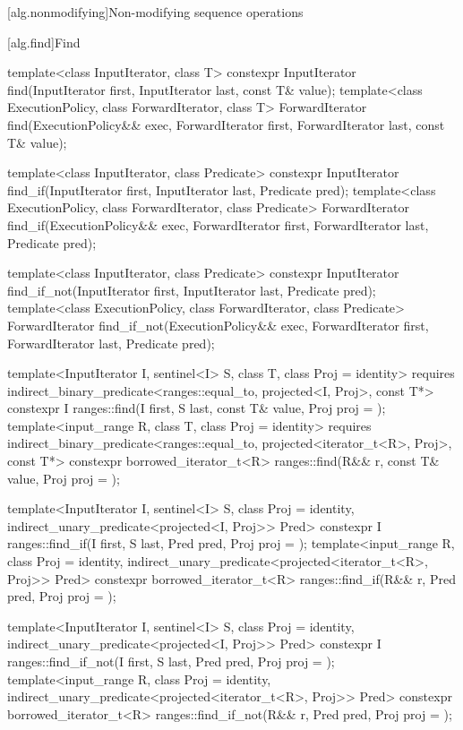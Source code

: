 [alg.nonmodifying]{Non-modifying sequence operations}

\setcounter{subsection}{4}
[alg.find]{Find}

%
%
%
\begin{itemdecl}
template<class InputIterator, class T>
  constexpr InputIterator find(InputIterator first, InputIterator last,
                               const T& value);
template<class ExecutionPolicy, class ForwardIterator, class T>
  ForwardIterator find(ExecutionPolicy&& exec, ForwardIterator first, ForwardIterator last,
                       const T& value);

template<class InputIterator, class Predicate>
  constexpr InputIterator find_if(InputIterator first, InputIterator last,
                                  Predicate pred);
template<class ExecutionPolicy, class ForwardIterator, class Predicate>
  ForwardIterator find_if(ExecutionPolicy&& exec, ForwardIterator first, ForwardIterator last,
                          Predicate pred);

template<class InputIterator, class Predicate>
  constexpr InputIterator find_if_not(InputIterator first, InputIterator last,
                                      Predicate pred);
template<class ExecutionPolicy, class ForwardIterator, class Predicate>
  ForwardIterator find_if_not(ExecutionPolicy&& exec,
                              ForwardIterator first, ForwardIterator last,
                              Predicate pred);

template<InputIterator I, sentinel<I> S, class T, class Proj = identity>
 requires indirect_binary_predicate<ranges::equal_to, projected<I, Proj>, const T*>
 constexpr I ranges::find(I first, S last, const T& value, Proj proj = {});
template<input_range R, class T, class Proj = identity>
 requires indirect_binary_predicate<ranges::equal_to, projected<iterator_t<R>, Proj>, const T*>
 constexpr borrowed_iterator_t<R>
   ranges::find(R&& r, const T& value, Proj proj = {});

template<InputIterator I, sentinel<I> S, class Proj = identity,
         indirect_unary_predicate<projected<I, Proj>> Pred>
  constexpr I ranges::find_if(I first, S last, Pred pred, Proj proj = {});
template<input_range R, class Proj = identity,
         indirect_unary_predicate<projected<iterator_t<R>, Proj>> Pred>
 constexpr borrowed_iterator_t<R>
   ranges::find_if(R&& r, Pred pred, Proj proj = {});

template<InputIterator I, sentinel<I> S, class Proj = identity,
         indirect_unary_predicate<projected<I, Proj>> Pred>
 constexpr I ranges::find_if_not(I first, S last, Pred pred, Proj proj = {});
template<input_range R, class Proj = identity,
         indirect_unary_predicate<projected<iterator_t<R>, Proj>> Pred>
 constexpr borrowed_iterator_t<R>
   ranges::find_if_not(R&& r, Pred pred, Proj proj = {});
\end{itemdecl}

